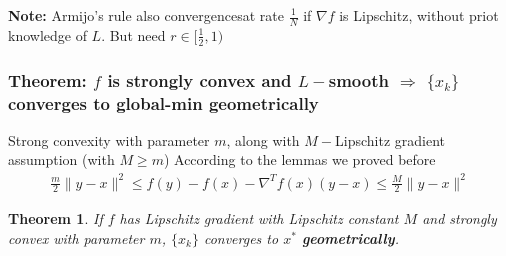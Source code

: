 \documentclass[11pt,a4paper]{article}
\newtheorem{theorem}{Theorem}
\begin{document}
\textbf{Note: }Armijo's rule also convergencesat rate $\frac{1}{N}$ if $\nabla f$ is Lipschitz, without priot knowledge of $L$. But need $r\in[\frac{1}{2},1)$


\subsubsection{Theorem: $f$ is strongly convex and $L-$smooth $\Rightarrow$ $\{x_k\}$ converges to global-min geometrically}

Strong convexity with parameter $m$, along with $M-$Lipschitz gradient assumption (with $M\geq m$)
According to the lemmas we proved before
\begin{equation}
    \begin{aligned}
        \frac{m}{2}\|y-x\|^2\leq f(y)-f(x)-\nabla^T f(x)(y-x)\leq \frac{M}{2}\|y-x\|^2
    \end{aligned}
    \nonumber
\end{equation}

\begin{theorem}
    If $f$ has Lipschitz gradient with Lipschitz constant $M$ and strongly convex with parameter $m$, $\{x_k\}$ converges to $x^*$ \textbf{geometrically}.
\end{theorem}
\end{document}
